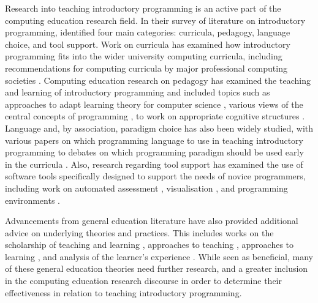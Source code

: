 Research into teaching introductory programming is an active part of the computing education research field. In their survey of literature on introductory programming, \citet{Pears:2007} identified four main categories: curricula, pedagogy, language choice, and tool support. Work on curricula has examined how introductory programming fits into the wider university computing curricula, including recommendations for computing curricula by major professional computing societies \cite{CSC2013}. Computing education research on pedagogy has examined the teaching and learning of introductory programming and included topics such as approaches to adapt learning theory for computer science \cite{BenAri:2001}, various views of the central concepts of programming \cite{Denning:1989,Dijkstra:1989,Hoare:1969,Palumbo:1990,Robins:2003}, to work on appropriate cognitive structures \cite{Eckerdal:2005,Green:1996,Green:2000,Soloway:1986}. Language and, by association, paradigm choice has also been widely studied, with various papers on which programming language to use in teaching introductory programming \cite{Anik:2011,Boszormenyi:1998,Bishop:2006,Brilliant:1996,Howell:2003,Kelleher:2005,Koffman:1988,Maloney:2010,Mannila:2006,Mannila:2006a,Mody:1991,Pendergast:2006,Roberts:1993} to debates on which programming paradigm should be used early in the curricula \cite{Astrachan:2005,Bennedsen:2004,Cooper:2003,Ehlert:2009,Howe:2004,Lister:2006a,Pattis:1993,Reges:2006}. Also, research regarding tool support has examined the use of software tools specifically designed to support the needs of novice programmers, including work on automated assessment \cite{AlaMutk:2007,Douce:2005}, visualisation \cite{Naps:2002}, and programming environments \cite{Gross:2005,Kelleher:2005,Kolling:2003}.

Advancements from general education literature have also provided additional advice on underlying theories and practices. This includes works on the scholarship of teaching and learning \cite{Boyer:1990}, approaches to teaching \cite{Martin:2000}, approaches to learning \cite{Marton:1976a,Entwistle:1991,Trigwell:1991,Trigwell:1999,Marton:2005}, and analysis of the learner's experience \cite{Marton:1997}. While seen as beneficial, many of these general education theories need further research, and a greater inclusion in the computing education research discourse in order to determine their effectiveness in relation to teaching introductory programming.

